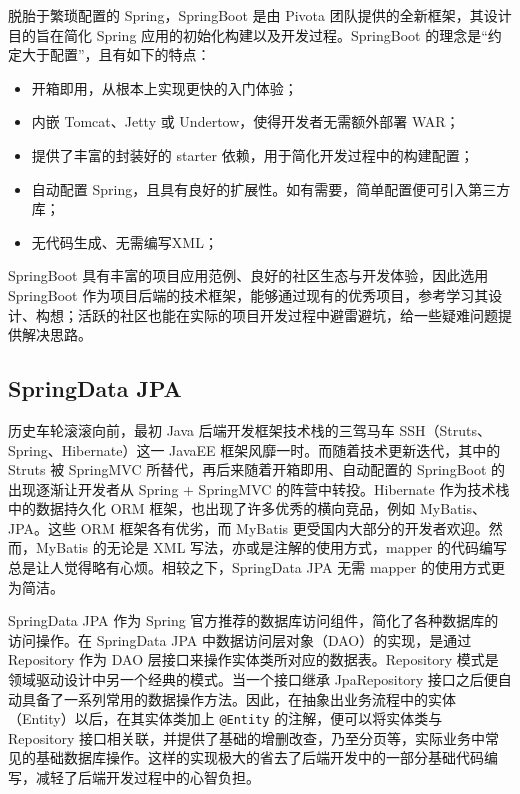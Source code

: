 脱胎于繁琐配置的 Spring，SpringBoot 是由 Pivota 团队提供的全新框架，其设计目的旨在简化 Spring 应用的初始化构建以及开发过程。SpringBoot 的理念是“约定大于配置”，且有如下的特点：
\begin{itemize}
    \item 开箱即用，从根本上实现更快的入门体验；
    \item 内嵌 Tomcat、Jetty 或 Undertow，使得开发者无需额外部署 WAR；
    \item 提供了丰富的封装好的 starter 依赖，用于简化开发过程中的构建配置；
    \item 自动配置 Spring，且具有良好的扩展性。如有需要，简单配置便可引入第三方库；
    \item 无代码生成、无需编写XML；
\end{itemize}

SpringBoot 具有丰富的项目应用范例、良好的社区生态与开发体验，因此选用 SpringBoot 作为项目后端的技术框架，能够通过现有的优秀项目，参考学习其设计、构想；活跃的社区也能在实际的项目开发过程中避雷避坑，给一些疑难问题提供解决思路。

\subsection{SpringData JPA}
历史车轮滚滚向前，最初 Java 后端开发框架技术栈的三驾马车 SSH（Struts、Spring、Hibernate）这一 JavaEE 框架风靡一时。而随着技术更新迭代，其中的 Struts 被 SpringMVC 所替代，再后来随着开箱即用、自动配置的 SpringBoot 的出现逐渐让开发者从 Spring + SpringMVC 的阵营中转投。Hibernate 作为技术栈中的数据持久化 ORM 框架，也出现了许多优秀的横向竞品，例如 MyBatis、JPA。这些 ORM 框架各有优劣，而 MyBatis 更受国内大部分的开发者欢迎。然而，MyBatis 的无论是 XML 写法，亦或是注解的使用方式，mapper 的代码编写总是让人觉得略有心烦。相较之下，SpringData JPA 无需 mapper 的使用方式更为简洁。

SpringData JPA 作为 Spring 官方推荐的数据库访问组件，简化了各种数据库的访问操作。在 SpringData JPA 中数据访问层对象（DAO）的实现，是通过 Repository 作为 DAO 层接口来操作实体类所对应的数据表。Repository 模式是领域驱动设计中另一个经典的模式。当一个接口继承 JpaRepository 接口之后便自动具备了一系列常用的数据操作方法。因此，在抽象出业务流程中的实体（Entity）以后，在其实体类加上  \verb!@Entity! 的注解，便可以将实体类与 Repository 接口相关联，并提供了基础的增删改查，乃至分页等，实际业务中常见的基础数据库操作。这样的实现极大的省去了后端开发中的一部分基础代码编写，减轻了后端开发过程中的心智负担。

